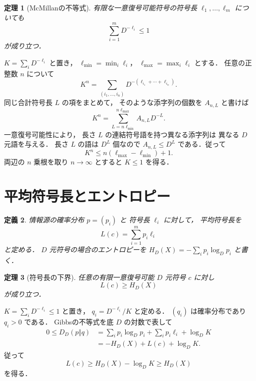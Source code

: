 \documentclass[a5paper,10pt,onecolumn]{jsarticle}
\makeatletter
\theoremstyle{mathnotetheorem}
\newtheorem{theorem}{定理}[section]
\newtheorem{definition}[theorem]{定義}
\renewcommand{\proofname}{証明}
\renewenvironment{proof}[1][\proofname]{%
  \par\pushQED{\qed}\normalfont\topsep4\p@\@plus2\p@\relax
  \trivlist\item[\hskip\labelsep\bfseries #1]\ignorespaces
}{\popQED\endtrivlist\@endpefalse}
\makeatother
\begin{document}
\begin{theorem}[McMillanの不等式]\label{thm:mcmillan}
有限な一意復号可能符号の符号長
$\ell_1,\dots,\ell_m$ についても
\[
 \sum_{i=1}^mD^{-\ell_i}\le1
\]
が成り立つ．
\end{theorem}
\begin{proof}
$K=\sum_iD^{-\ell_i}$ と置き，
$\ell_{\min}=\min_i\ell_i$，
$\ell_{\max}=\max_i\ell_i$ とする．
任意の正整数 $n$ について
\[
 K^n=\sum_{(i_1,\dots,i_n)}
 D^{-(\ell_{i_1}+\cdots+\ell_{i_n})}.
\]
同じ合計符号長 $L$ の項をまとめて，
そのような添字列の個数を $A_{n,L}$ と書けば
\[
 K^n=\sum_{L=n\ell_{\min}}^{n\ell_{\max}}
 A_{n,L}D^{-L}.
\]
一意復号可能性により，
長さ $L$ の連結符号語を持つ異なる添字列は
異なる $D$ 元語を与える．
長さ $L$ の語は $D^L$ 個なので
$A_{n,L}\le D^L$ である．従って
\[
 K^n\le n(\ell_{\max}-\ell_{\min})+1.
\]
両辺の $n$ 乗根を取り $n\to\infty$ とすると
$K\le1$ を得る．
\end{proof}

\section{平均符号長とエントロピー}

\begin{definition}
情報源の確率分布 $p=(p_i)$ と
符号長 $\ell_i$ に対して，
平均符号長を
\[
 L(c)=\sum_{i=1}^mp_i\ell_i
\]
と定める．
$D$ 元符号の場合のエントロピーを
$H_D(X)=-\sum_ip_i\log_Dp_i$ と書く．
\end{definition}

\begin{theorem}[符号長の下界]\label{thm:source-lower}
任意の有限一意復号可能 $D$ 元符号 $c$ に対し
\[
 L(c)\ge H_D(X)
\]
が成り立つ．
\end{theorem}
\begin{proof}
$K=\sum_iD^{-\ell_i}\le1$ と置き，
$q_i=D^{-\ell_i}/K$ と定める．
$(q_i)$ は確率分布であり $q_i>0$ である．
Gibbsの不等式を底 $D$ の対数で表して
\[
 \begin{aligned}
 0\le D_D(p\Vert q)
 &=\sum_ip_i\log_Dp_i
   +\sum_ip_i\ell_i+\log_D K\\
 &=-H_D(X)+L(c)+\log_D K.
 \end{aligned}
\]
従って
\[
 L(c)\ge H_D(X)-\log_DK\ge H_D(X)
\]
を得る．
\end{proof}
\end{document}
